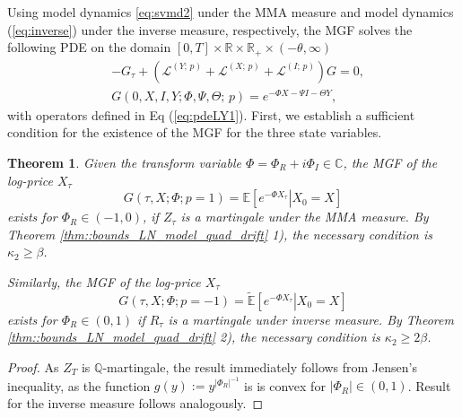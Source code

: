 \documentclass[pdftex,11pt,a4paper] {article}
\newtheorem{theorem}{Theorem}[section]
\begin{document}
Using model dynamics \eqref{eq:svmd2} under the MMA measure and model dynamics (\ref{eq:inverse}) under the inverse measure, respectively, the MGF solves the following PDE on the domain $[0,T]\times\mathbb{R}\times\mathbb{R}_{+}\times (-\theta,\infty)$
\begin{equation} \label{eq:mgf1}
\begin{split}
&-G_{\tau}  +\left( \mathcal{L}^{(Y;\,p)} + \mathcal{L}^{(X;\,p)} + \mathcal{L}^{(I;\,p)} \right)G=0,\\
&  G(0,X,I,Y; \Phi,\Psi,\Theta;\,p) = e^{-\Phi X-\Psi I-\Theta Y},
\end{split}
\end{equation}
with operators defined in Eq (\ref{eq:pdeLY1}). First, we establish a sufficient condition for the existence of the MGF for the three state variables. 
\begin{theorem}\label{thm::existence_MGF_X}
Given the transform variable $\Phi=\Phi_R+i\Phi_I\in \mathbb{C}$, the MGF of the log-price $X_\tau$
\begin{equation*}
G(\tau,X;\Phi;p=1)=\mathbb{E}[\left. e^{-\Phi X_\tau}\right|X_0=X]
\end{equation*}
exists for $\Phi_R\in (-1,0)$, if $Z_\tau$ is a martingale under the MMA measure. By Theorem \ref{thm::bounds_LN_model_quad_drift} 1), the necessary condition is $\kappa_2\ge \beta$.


Similarly, the MGF of the log-price $X_\tau$
\begin{equation*}
G(\tau,X;\Phi;p=-1)=\tilde{\mathbb{E}}[\left. e^{-\Phi X_\tau}\right|X_0=X]
\end{equation*}
exists for $\Phi_R\in (0,1)$ if $R_\tau$ is a martingale under inverse measure. By Theorem \ref{thm::bounds_LN_model_quad_drift} 2), the necessary condition is $\kappa_2\ge 2\beta$. 
\end{theorem}
%
\begin{proof}
As $Z_T$ is $\mathbb{Q}$-martingale, the result immediately follows from Jensen's inequality, as the function $g(y):=y^{|\Phi_R|^{-1}}$ is is convex for $|\Phi_R|\in (0,1)$. Result for the inverse measure follows analogously. 
\end{proof}
\end{document}
